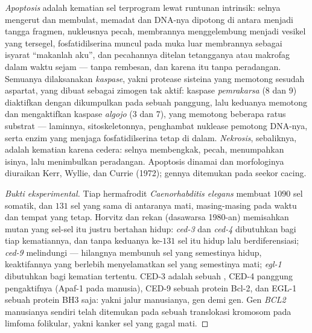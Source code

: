 \begin{definition}[Apoptosis]\label{def:b3:cell-cycle-apoptosis:apoptosis}
\emph{Apoptosis} adalah kematian sel terprogram lewat runtunan intrinsik:
selnya mengerut dan membulat,  memadat dan DNA-nya dipotong
di antara  menjadi tangga fragmen, nukleusnya pecah,
membrannya menggelembung menjadi vesikel yang tersegel, fosfatidilserina
muncul pada muka luar membrannya sebagai isyarat ``makanlah aku'', dan
pecahannya ditelan tetangganya atau makrofag dalam waktu sejam ---
tanpa rembesan, dan karena itu tanpa peradangan. Semuanya dilaksanakan
\emph{kaspase}, yakni protease sisteina yang memotong sesudah aspartat, yang
dibuat sebagai zimogen tak aktif: kaspase \emph{pemrakarsa} (8 dan 9)
diaktifkan dengan dikumpulkan pada sebuah panggung, lalu keduanya memotong dan
mengaktifkan kaspase \emph{algojo} (3 dan 7), yang memotong beberapa ratus
substrat --- laminnya, sitoskeletonnya, penghambat nuklease pemotong DNA-nya,
serta enzim yang menjaga fosfatidilserina tetap di dalam.
\emph{Nekrosis}, sebaliknya, adalah kematian karena cedera: selnya membengkak,
pecah, menumpahkan isinya, lalu menimbulkan peradangan. Apoptosis dinamai dan
morfologinya diuraikan Kerr, Wyllie, dan Currie (1972);
gennya ditemukan pada seekor cacing.
\end{definition}

\begin{proof}[Bukti eksperimental]
Tiap hermafrodit \emph{Caenorhabditis elegans} membuat $1090$ sel somatik,
dan $131$ sel yang sama di antaranya mati, masing-masing pada waktu dan tempat
yang tetap. Horvitz dan rekan (dasawarsa 1980-an) memisahkan mutan yang
sel-sel itu justru bertahan hidup: \emph{ced-3} dan \emph{ced-4} dibutuhkan
bagi tiap kematiannya, dan tanpa keduanya ke-$131$ sel itu hidup lalu
berdiferensiasi; \emph{ced-9} melindungi --- hilangnya membunuh sel yang
semestinya hidup, keaktifannya yang berlebih menyelamatkan sel yang semestinya
mati; \emph{egl-1} dibutuhkan bagi kematian tertentu. CED-3 adalah sebuah
, CED-4 panggung pengaktifnya (Apaf-1 pada manusia), CED-9 sebuah
protein Bcl-2, dan EGL-1 sebuah protein BH3 saja: yakni jalur manusianya, gen
demi gen. Gen \emph{BCL2} manusianya sendiri telah ditemukan pada sebuah
translokasi kromosom pada limfoma folikular, yakni kanker sel yang gagal mati.
\end{proof}

